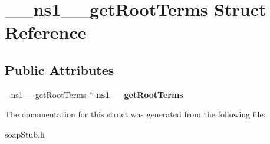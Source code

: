 \hypertarget{struct____ns1____getRootTerms}{
\section{\_\-\_\-ns1\_\-\_\-getRootTerms Struct Reference}
\label{struct____ns1____getRootTerms}
}
\subsection*{Public Attributes}
\begin{DoxyCompactItemize}
\item 
\hypertarget{struct____ns1____getRootTerms_ac76558d2add75547a253d8d8d7f85532}{
\hyperlink{class__ns1____getRootTerms}{\_\-ns1\_\-\_\-getRootTerms} $\ast$ {\bfseries ns1\_\-\_\-getRootTerms}}
\label{struct____ns1____getRootTerms_ac76558d2add75547a253d8d8d7f85532}

\end{DoxyCompactItemize}


The documentation for this struct was generated from the following file:\begin{DoxyCompactItemize}
\item 
soapStub.h\end{DoxyCompactItemize}
